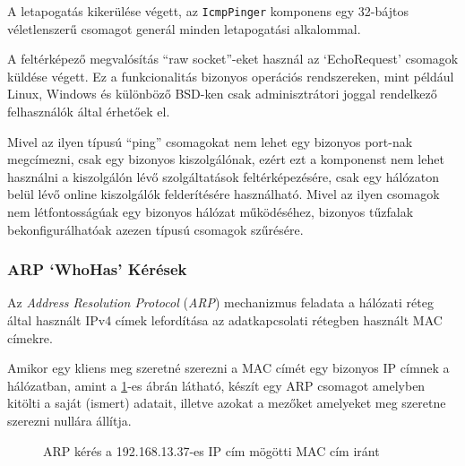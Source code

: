 \documentclass[a4paper,12pt]{article}
\begin{document}
	A letapogatás kikerülése végett, az \texttt{IcmpPinger} komponens egy 32-bájtos véletlenszerű csomagot generál minden letapogatási alkalommal.
	
	A feltérképező megvalósítás ``raw socket''-eket használ az `EchoRequest' csomagok küldése végett. Ez a funkcionalitás bizonyos operációs rendszereken, mint például Linux, Windows és különböző BSD-ken csak adminisztrátori joggal rendelkező felhasználók által érhetőek el.

	Mivel az ilyen típusú ``ping'' csomagokat nem lehet egy bizonyos port-nak megcímezni, csak egy bizonyos kiszolgálónak, ezért ezt a komponenst nem lehet használni a kiszolgálón lévő szolgáltatások feltérképezésére, csak egy hálózaton belül lévő online kiszolgálók felderítésére használható. Mivel az ilyen csomagok nem létfontosságúak egy bizonyos hálózat működéséhez, bizonyos tűzfalak bekonfigurálhatóak azezen típusú csomagok szűrésére.

\subsubsection{ARP `WhoHas' Kérések} \label{ssec:arpping}

	Az \textit{Address Resolution Protocol} (\textit{ARP}) mechanizmus feladata a hálózati réteg által használt IPv4 címek lefordítása az adatkapcsolati rétegben használt MAC címekre.
	
	Amikor egy kliens meg szeretné szerezni a MAC címét egy bizonyos IP címnek a hálózatban, amint a \ref{arpreq}-es ábrán látható, készít egy ARP csomagot amelyben kitölti a saját (ismert) adatait, illetve azokat a mezőket amelyeket meg szeretne szerezni nullára állítja.
	
	\begin{figure}[!htbp]
		\centering
		\caption{ARP kérés a 192.168.13.37-es IP cím mögötti MAC cím iránt}
		\label{arpreq}
	\end{figure}
	
\end{document}
